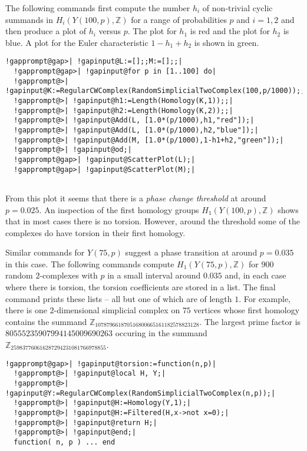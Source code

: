 \documentclass[a4paper,11pt]{report}
\begin{document}
{{The following commands first compute the number $h_i$ of non-trivial cyclic summands in $H_i(Y(100,p), \mathbb Z)$ for a range of probabilities $p$ and $i=1,2$ and then produce a plot of $h_i$ versus $p$. The plot for $h_1$ is red and the plot for $h_2$ is blue. A plot for the Euler characteristic $1-h_1+h_2$ is shown in green. 
\begin{Verbatim}[commandchars=!@|,fontsize=\small,frame=single,label=Example]
  !gapprompt@gap>| !gapinput@L:=[];;M:=[];;|
  !gapprompt@gap>| !gapinput@for p in [1..100] do|
  !gapprompt@>| !gapinput@K:=RegularCWComplex(RandomSimplicialTwoComplex(100,p/1000));;|
  !gapprompt@>| !gapinput@h1:=Length(Homology(K,1));;|
  !gapprompt@>| !gapinput@h2:=Length(Homology(K,2));;|
  !gapprompt@>| !gapinput@Add(L, [1.0*(p/1000),h1,"red"]);|
  !gapprompt@>| !gapinput@Add(L, [1.0*(p/1000),h2,"blue"]);|
  !gapprompt@>| !gapinput@Add(M, [1.0*(p/1000),1-h1+h2,"green"]);|
  !gapprompt@>| !gapinput@od;|
  !gapprompt@gap>| !gapinput@ScatterPlot(L);|
  !gapprompt@gap>| !gapinput@ScatterPlot(M);|
  
\end{Verbatim}
 

   

From this plot it seems that there is a \emph{phase change threshold} at around $p=0.025$. An inspection of the first homology groups $H_1(Y(100,p), \mathbb Z)$ shows that in most cases there is no torsion. However, around the threshold
some of the complexes do have torsion in their first homology. 

Similar commands for $Y(75,p)$ suggest a phase transition at around $p=0.035$ in this case. The following commands compute $H_1(Y(75,p), \mathbb Z)$ for $900$ random $2$-complexes with $p$ in a small interval around $ 0.035$ and, in each case where there is torsion, the torsion coefficients are stored
in a list. The final command prints these lists -- all but one of which are of
length $1$. For example, there is one $2$-dimensional simplicial complex on $75$ vertices whose first homology contains the summand $\mathbb Z_{107879661870516800665161182578823128}$. The largest prime factor is $80555235907994145009690263$ occuring in the summand $\mathbb Z_{259837760616287294231081766978855}$. 
\begin{Verbatim}[commandchars=!@|,fontsize=\small,frame=single,label=Example]
  !gapprompt@gap>| !gapinput@torsion:=function(n,p)|
  !gapprompt@>| !gapinput@local H, Y;|
  !gapprompt@>| !gapinput@Y:=RegularCWComplex(RandomSimplicialTwoComplex(n,p));|
  !gapprompt@>| !gapinput@H:=Homology(Y,1);|
  !gapprompt@>| !gapinput@H:=Filtered(H,x->not x=0);|
  !gapprompt@>| !gapinput@return H;|
  !gapprompt@>| !gapinput@end;|
  function( n, p ) ... end
  

\end{Verbatim}}}
\end{document}
